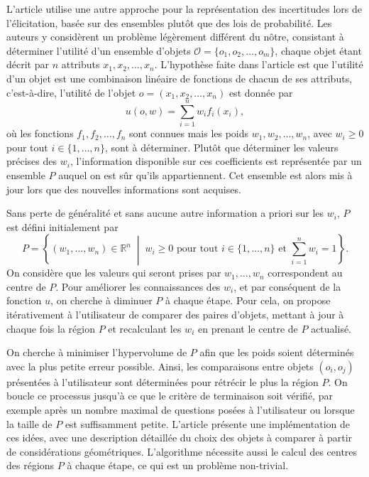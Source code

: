 \documentclass[a4paper,11pt]{article}
\theoremstyle{plain}
\begin{document}
L'article \cite{iyengar_q-eval_2001} utilise une autre approche pour la représentation des incertitudes lors de l'élicitation, basée sur des ensembles plutôt que des lois de probabilité. Les auteurs y considèrent un problème légèrement différent du nôtre, consistant à déterminer l'utilité d'un ensemble d'objets $\mathcal O = \{o_1, o_2, \dotsc, o_m\}$, chaque objet étant décrit par $n$ attributs $x_1, x_2, \dotsc, x_n$. L'hypothèse faite dans l'article est que l'utilité d'un objet est une combinaison linéaire de fonctions de chacun de ses attributs, c'est-à-dire, l'utilité de l'objet $o = (x_1, x_2, \dotsc, x_n)$ est donnée par
\[u(o, w) = \sum_{i = 1}^{n} w_i f_i(x_i),\]
où les fonctions $f_1, f_2, \dotsc, f_n$ sont connues mais les poids $w_1, w_2, \dotsc, w_n$, avec $w_i \geq 0$ pour tout $i \in \{1, \dotsc, n\}$, sont à déterminer. Plutôt que déterminer les valeurs précises des $w_i$, l'information disponible sur ces coefficients est représentée par un ensemble $P$ auquel on est sûr qu'ils appartiennent. Cet ensemble est alors mis à jour lors que des nouvelles informations sont acquises.

Sans perte de généralité et sans aucune autre information a priori sur les $w_i$, $P$ est défini initialement par
\[P = \left\{(w_1, \dotsc, w_n) \in \mathbb R^n \;\middle\vert\; w_i \geq 0 \text{ pour tout } i \in \{1, \dotsc, n\} \text{ et } \sum_{i=1}^n w_i = 1\right\}.\]
%
On considère que les valeurs qui seront prises par $w_1, \dotsc, w_n$ correspondent au centre de $P$. Pour améliorer les connaissances des $w_i$, et par conséquent de la fonction $u$, on cherche à diminuer $P$ à chaque étape. Pour cela, on propose itérativement à l'utilisateur de comparer des paires d'objets, mettant à jour à chaque fois la région $P$ et recalculant les $w_i$ en prenant le centre de $P$ actualisé.

On cherche à minimiser l'hypervolume de $P$ afin que les poids soient déterminés avec la plus petite erreur possible. Ainsi, les comparaisons entre objets $(o_i, o_j)$ présentées à l'utilisateur sont déterminées pour rétrécir le plus la région $P$. On boucle ce processus jusqu'à ce que le critère de terminaison soit vérifié, par exemple après un nombre maximal de questions posées à l'utilisateur ou lorsque la taille de $P$ est suffisamment petite. L'article \cite{iyengar_q-eval_2001} présente une implémentation de ces idées, avec une description détaillée du choix des objets à comparer à partir de considérations géométriques. L'algorithme nécessite aussi le calcul des centres des régions $P$ à chaque étape, ce qui est un problème non-trivial.
\end{document}
